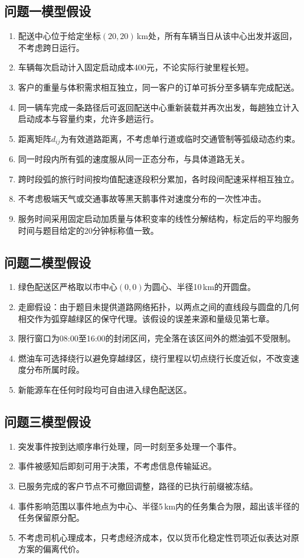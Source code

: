 \documentclass[12pt,a4paper]{article}
\begin{document}
\subsection{问题一模型假设}
\begin{enumerate}[label=(\arabic*)]
	\item 配送中心位于给定坐标$(20,20)$\,km处，所有车辆当日从该中心出发并返回，不考虑跨日运行。
	\item 车辆每次启动计入固定启动成本400元，不论实际行驶里程长短。
	\item 客户的重量与体积需求相互独立，同一客户的订单可拆分至多辆车完成配送。
	\item 同一辆车完成一条路径后可返回配送中心重新装载并再次出发，每趟独立计入启动成本与容量约束，允许多趟运行。
	\item 距离矩阵$d_{ij}$为有效道路距离，不考虑单行道或临时交通管制等弧级动态约束。
	\item 同一时段内所有弧的速度服从同一正态分布，与具体道路无关。
	\item 跨时段弧的旅行时间按均值配速逐段积分累加，各时段间配速采样相互独立。
	\item 不考虑极端天气或交通事故等黑天鹅事件对速度分布的一次性冲击。
	\item 服务时间采用固定启动加质量与体积变率的线性分解结构，标定后的平均服务时间与题目给定的20分钟标称值一致。
\end{enumerate}

\subsection{问题二模型假设}
\begin{enumerate}[label=(\arabic*)]
	\item 绿色配送区严格取以市中心$(0,0)$为圆心、半径10\,km的开圆盘。
	\item 走廊假设：由于题目未提供道路网络拓扑，以两点之间的直线段与圆盘的几何相交作为弧穿越绿区的保守代理。该假设的误差来源和量级见第七章。
	\item 限行窗口为08:00至16:00的封闭区间，完全落在该区间外的燃油弧不受限制。
	\item 燃油车可选择绕行以避免穿越绿区，绕行里程以切点绕行长度近似，不改变速度分布所属时段。
	\item 新能源车在任何时段均可自由进入绿色配送区。
\end{enumerate}

\subsection{问题三模型假设}
\begin{enumerate}[label=(\arabic*)]
	\item 突发事件按到达顺序串行处理，同一时刻至多处理一个事件。
	\item 事件被感知后即刻可用于决策，不考虑信息传输延迟。
	\item 已服务完成的客户节点不可撤回调整，路径的已执行前缀被冻结。
	\item 事件影响范围以事件地点为中心、半径5\,km内的任务集合为限，超出该半径的任务保留原分配。
	\item 不考虑司机心理成本，只考虑经济成本，仅以货币化稳定性罚项近似表达对原方案的偏离代价。
\end{enumerate}
\end{document}
